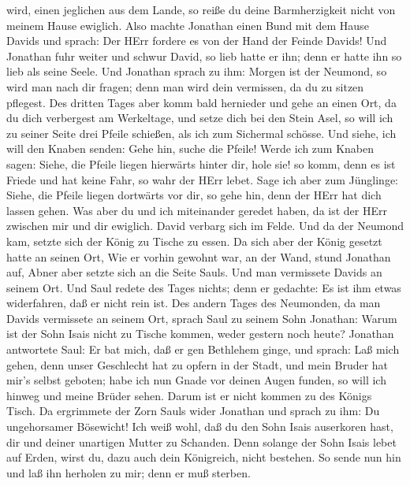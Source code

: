 wird, einen jeglichen aus dem Lande, so reiße du deine Barmherzigkeit
nicht von meinem Hause ewiglich.  Also machte Jonathan
einen Bund mit dem Hause Davids und sprach: Der HErr fordere es von der
Hand der Feinde Davids!  Und Jonathan fuhr weiter und
schwur David, so lieb hatte er ihn; denn er hatte ihn so lieb als seine
Seele.  Und Jonathan sprach zu ihm: Morgen ist der Neumond,
so wird man nach dir fragen; denn man wird dein vermissen, da du zu
sitzen pflegest.  Des dritten Tages aber komm bald
hernieder und gehe an einen Ort, da du dich verbergest am Werkeltage,
und setze dich bei den Stein Asel,  so will ich zu seiner
Seite drei Pfeile schießen, als ich zum Sichermal schösse. 
Und siehe, ich will den Knaben senden: Gehe hin, suche die Pfeile! Werde
ich zum Knaben sagen: Siehe, die Pfeile liegen hierwärts hinter dir,
hole sie! so komm, denn es ist Friede und hat keine Fahr, so wahr der
HErr lebet.  Sage ich aber zum Jünglinge: Siehe, die Pfeile
liegen dortwärts vor dir, so gehe hin, denn der HErr hat dich lassen
gehen.  Was aber du und ich miteinander geredet haben, da
ist der HErr zwischen mir und dir ewiglich.  David verbarg
sich im Felde. Und da der Neumond kam, setzte sich der König zu Tische
zu essen.  Da sich aber der König gesetzt hatte an seinen
Ort, Wie er vorhin gewohnt war, an der Wand, stund Jonathan auf, Abner
aber setzte sich an die Seite Sauls. Und man vermissete Davids an seinem
Ort.  Und Saul redete des Tages nichts; denn er gedachte:
Es ist ihm etwas widerfahren, daß er nicht rein ist.  Des
andern Tages des Neumonden, da man Davids vermissete an seinem Ort,
sprach Saul zu seinem Sohn Jonathan: Warum ist der Sohn Isais nicht zu
Tische kommen, weder gestern noch heute?  Jonathan
antwortete Saul: Er bat mich, daß er gen Bethlehem ginge, 
und sprach: Laß mich gehen, denn unser Geschlecht hat zu opfern in der
Stadt, und mein Bruder hat mir's selbst geboten; habe ich nun Gnade vor
deinen Augen funden, so will ich hinweg und meine Brüder sehen. Darum
ist er nicht kommen zu des Königs Tisch.  Da ergrimmete der
Zorn Sauls wider Jonathan und sprach zu ihm: Du ungehorsamer Bösewicht!
Ich weiß wohl, daß du den Sohn Isais auserkoren hast, dir und deiner
unartigen Mutter zu Schanden.  Denn solange der Sohn Isais
lebet auf Erden, wirst du, dazu auch dein Königreich, nicht bestehen. So
sende nun hin und laß ihn herholen zu mir; denn er muß sterben.
